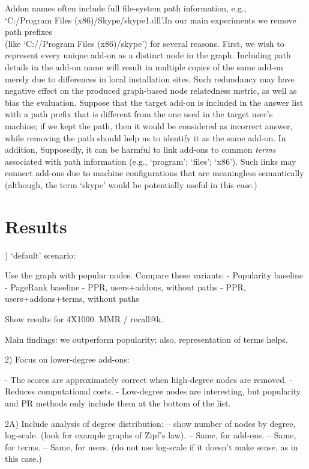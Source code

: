 \documentclass[11pt,oneside]{book}
\let\Oldsection\section
\renewcommand{\section}{\FloatBarrier\Oldsection}
\begin{document}
Addon names often include full file-system path information, e.g., \\
`C:/Program Files (x86)/Skype/skype1.dll'.In our main experiments we remove path prefixes \\
(like `C://Program Files (x86)/skype') for several reasons. First, we wish to represent every unique add-on as a distinct node in the graph. Including path details in the add-on name will result in multiple copies of the same add-on merely due to differences in local installation sites. Such redundancy may have negative effect on the produced  graph-based node relatedness metric, as well as bias the evaluation. 
Suppose that the target add-on is included in the answer list with a path prefix that is different from the one used in the target user's machine; if we kept the path, then it would be considered as incorrect answer, while removing the path should help us to identify it as the same add-on. In addition, Supposedly, it can be harmful to link add-ons to common {\it terms} associated with path information (e.g., `program'; `files'; `x86'). Such links may connect add-ons due to machine configurations that are meaningless semantically (although, the term `skype' would be potentially useful in this case.)


\section{Results}
\label{sec:user_main_results}

) `default' scenario:

Use the graph with popular nodes. Compare these variants:
- Popularity baseline
- PageRank baseline
- PPR, users+addons, without paths
- PPR, users+addons+terms, without paths

Show results for 4X1000. MMR / recall@k.

Main findings: we outperform popularity; also, representation of terms helps.

2) Focus on lower-degree add-ons:

- The scores are approximately correct when high-degree nodes are removed.
- Reduces computational costs.
- Low-degree nodes are interesting, but popularity and PR methods only include them at the bottom of the list.

2A) Include analysis of degree distribution: 
-- show number of nodes by degree, log-scale. (look for example graphs of Zipf's law).
-- Same, for add-ons.
-- Same, for terms.
-- Same, for users. (do not use log-scale if it doesn't make sense, as in this case.)
\end{document}
